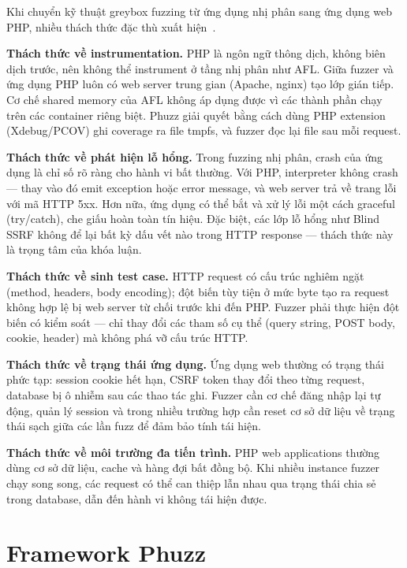 Khi chuyển kỹ thuật greybox fuzzing từ ứng dụng nhị phân sang ứng dụng web
PHP, nhiều thách thức đặc thù xuất hiện~\cite{neef2024phuzz,
vanrooij2021webfuzz}.

\textbf{Thách thức về instrumentation.} PHP là ngôn ngữ thông dịch,
không biên dịch trước, nên không thể instrument ở tầng nhị phân như AFL.
Giữa fuzzer và ứng dụng PHP luôn có web server trung gian (Apache, nginx)
tạo lớp gián tiếp. Cơ chế shared memory của AFL không áp dụng được vì các
thành phần chạy trên các container riêng biệt. Phuzz giải quyết bằng cách
dùng PHP extension (Xdebug/PCOV) ghi coverage ra file tmpfs, và fuzzer đọc
lại file sau mỗi request.

\textbf{Thách thức về phát hiện lỗ hổng.} Trong fuzzing nhị phân, crash
của ứng dụng là chỉ số rõ ràng cho hành vi bất thường. Với PHP, interpreter
không crash --- thay vào đó emit exception hoặc error message, và web server
trả về trang lỗi với mã HTTP 5xx. Hơn nữa, ứng dụng có thể bắt và xử lý
lỗi một cách graceful (try/catch), che giấu hoàn toàn tín hiệu. Đặc biệt,
các lớp lỗ hổng như Blind SSRF không để lại bất kỳ dấu vết nào trong HTTP
response --- thách thức này là trọng tâm của khóa luận.

\textbf{Thách thức về sinh test case.} HTTP request có cấu trúc nghiêm ngặt
(method, headers, body encoding); đột biến tùy tiện ở mức byte tạo ra request
không hợp lệ bị web server từ chối trước khi đến PHP. Fuzzer phải thực hiện
đột biến có kiểm soát --- chỉ thay đổi các tham số cụ thể (query string,
POST body, cookie, header) mà không phá vỡ cấu trúc HTTP.

\textbf{Thách thức về trạng thái ứng dụng.} Ứng dụng web thường có trạng
thái phức tạp: session cookie hết hạn, CSRF token thay đổi theo từng request,
database bị ô nhiễm sau các thao tác ghi. Fuzzer cần cơ chế đăng nhập lại tự
động, quản lý session và trong nhiều trường hợp cần reset cơ sở dữ liệu về
trạng thái sạch giữa các lần fuzz để đảm bảo tính tái hiện.

\textbf{Thách thức về môi trường đa tiến trình.} PHP web applications thường
dùng cơ sở dữ liệu, cache và hàng đợi bất đồng bộ. Khi nhiều instance fuzzer
chạy song song, các request có thể can thiệp lẫn nhau qua trạng thái chia
sẻ trong database, dẫn đến hành vi không tái hiện được.

\section{Framework Phuzz}
\label{sec:phuzz}

